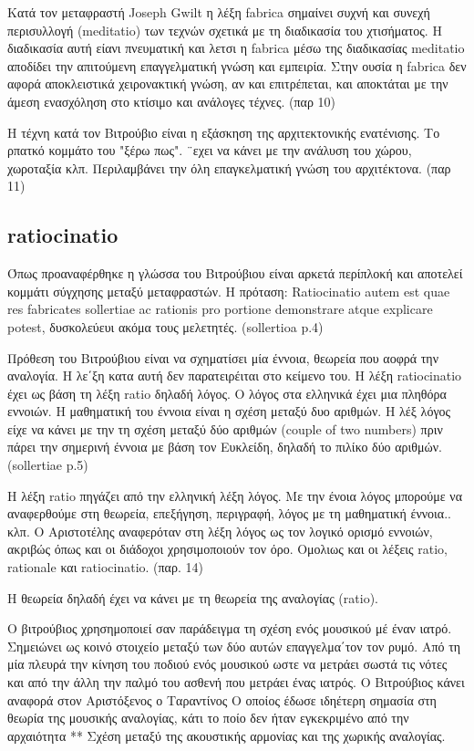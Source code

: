 Κατά τον μεταφραστή Joseph Gwilt η λέξη fabrica σημαίνει συχνή και συνεχή
περισυλλογή (meditatio) των τεχνών σχετικά με τη διαδικασία του χτισήματος. Η
διαδικασία αυτή είανι πνευματική και λετσι η fabrica μέσω της διαδικασίας
meditatio αποδίδει την απιτούμενη επαγγελματική γνώση και εμπειρία. Στην ουσία η
fabrica δεν αφορά αποκλειστικά χειρονακτική γνώση, αν και επιτρέπεται, και
αποκτάται με την άμεση ενασχόληση στο κτίσιμο και ανάλογες τέχνες. (παρ 10)

Η τέχνη κατά τον Βιτρούβιο είναι η εξάσκηση της αρχιτεκτονικής ενατένισης. Το
ρπατκό κομμάτο του "ξέρω πως". ¨εχει να κάνει με την ανάλυση του χώρου,
χωροταξία κλπ. Περιλαμβάνει την όλη επαγκελματική γνώση του αρχιτέκτονα. (παρ
11)

\subsection{ratiocinatio}

Όπως προαναφέρθηκε η γλώσσα του Βιτρούβιου είναι αρκετά περίπλοκή και αποτελεί
κομμάτι σύγχησης μεταξύ μεταφραστών. Η πρόταση:  Ratiocinatio autem est quae res
fabricates sollertiae ac
rationis pro portione demonstrare atque explicare potest, δυσκολεύευι ακόμα τους
μελετητές. (sollertioa p.4)

Πρόθεση του Βιτρούβιου είναι να σχηματίσει μία έννοια, θεωρεία που αοφρά την
αναλογία. Η λε΄ξη κατα αυτή δεν παρατειρέιται στο κείμενο του. Η λέξη
ratiocinatio έχει ως βάση τη λέξη ratio δηλαδή λόγος. Ο λόγος στα ελληνικά έχει
μια πληθόρα εννοιών. Η μαθηματική του έννοια είναι η σχέση μεταξύ δυο αριθμών. Η
λέξ λόγος είχε να κάνει με την τη σχέση μεταξύ δύο αριθμών (couple of two
numbers) πριν πάρει την σημερινή έννοια με βάση τον Ευκλείδη, δηλαδή το πιλίκο
δύο αριθμών. (sollertiae p.5)

Η λέξη ratio πηγάζει από την ελληνική λέξη λόγος. Με την ένοια λόγος μπορούμε
να αναφερθούμε στη θεωρεία, επεξήγηση, περιγραφή, λόγος με τη μαθηματική
έννοια.. κλπ. Ο Αριστοτέλης αναφερόταν στη λέξη λόγος ως τον λογικό ορισμό
εννοιών, ακριβώς όπως και οι διάδοχοι χρησιμοποιούν τον όρο. Ομολιως και οι
λέξεις ratio, rationale και ratiocinatio. (παρ. 14)

Η θεωρεία δηλαδή έχει να κάνει με τη θεωρεία της αναλογίας (ratio). 

Ο βιτρούβιος χρησημοποιεί σαν παράδειγμα τη σχέση ενός μουσικού μέ έναν ιατρό.
Σημειώνει ως κοινό στοιχείο μεταξύ των δύο αυτών επαγγελμα΄τον τον ρυμό. Από τη
μία πλευρά την κίνηση του ποδιού ενός μουσικού ωστε να μετράει σωστά τις νότες
και από την άλλη την παλμό του ασθενή που μετράει ένας ιατρός. Ο Βιτρούβιος
κάνει αναφορά στον Αριστόξενος ο Ταραντίνος Ο οποίος έδωσε ιδηέτερη σημασία στη
θεωρία της μουσικής αναλογίας, κάτι το ποίο δεν ήταν εγκεκριμένο από την
αρχαιότητα ** Σχέση μεταξύ της ακουστικής αρμονίας και της χωρικής αναλογίας. 

